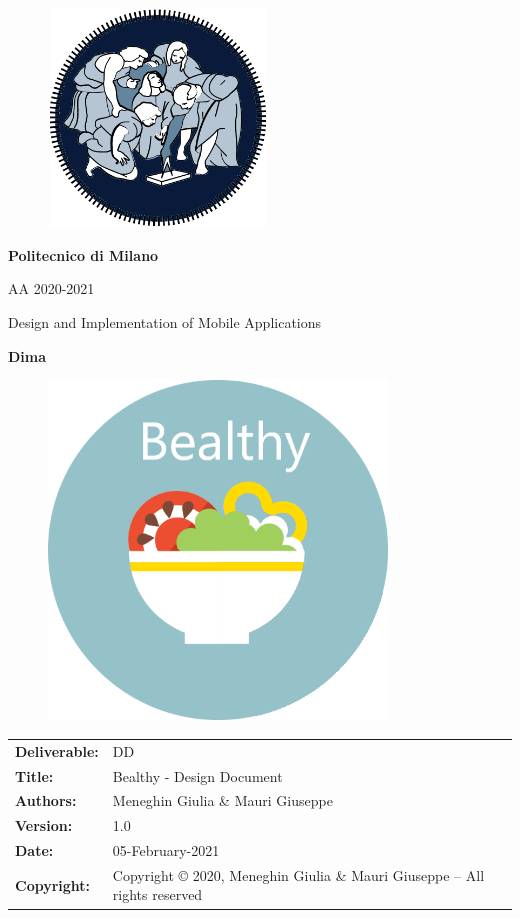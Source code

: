 \documentclass [12pt]{article}
\begin{document}
\begin{figure}[ht!]
\centering
\includegraphics[height=5.8cm,width=5.8cm]{logopoli.png}
\end{figure}
\begin{large}
\centerline{\textbf{Politecnico di Milano} }
\centerline{AA 2020-2021}
\vspace{0.5cm}
\centerline{Design and Implementation of Mobile Applications}
\centerline{\textbf{Dima}}
\end{large}
\vspace{2cm}
\begin{figure}[ht!]
\centering
\includegraphics[width=9cm, height=9cm]{Immaginecopertina.png}
\end{figure} 

\clearpage

\begin{table}[h!]
\begin{tabu} to \textwidth { X[0.3,r,p] X[0.7,l,p] }
\hline

\textbf{Deliverable:} & DD\\
\textbf{Title:} & Bealthy - Design Document \\
\textbf{Authors:} & Meneghin Giulia \& Mauri Giuseppe \\
\textbf{Version:} & 1.0 \\ 
\textbf{Date:} & 05-February-2021 \\
\textbf{Copyright:} & Copyright © 2020, Meneghin Giulia \& Mauri Giuseppe – All rights reserved \\
\hline
\end{tabu}
\end{table}
\end{document}
